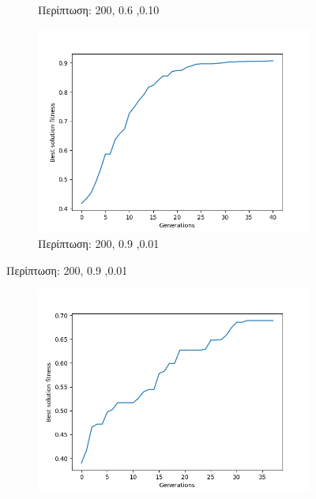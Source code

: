 \documentclass[12pt,a4paper]{article}
\begin{document}
\begin{enumerate}
\begin{figure}[H]
\begin{subfigure}[h]{0.7\textwidth}
                         \caption*{Περίπτωση: 200, 0.6 ,0.10}
                     \end{subfigure}
                     \begin{subfigure}[h]{0.7\textwidth}
                         \centering
                         \includegraphics[width=\textwidth]{images/9.png}
                         \caption*{Περίπτωση: 200, 0.9 ,0.01}
                     \end{subfigure}
                 \end{figure}
                 \begin{figure}[H]
                     \centering
                     \begin{subfigure}[ht]{0.7\textwidth}
                         \centering
                         \includegraphics[width=\textwidth]{images/10.png}

\end{subfigure}
\end{figure}
\end{enumerate}
\end{document}

